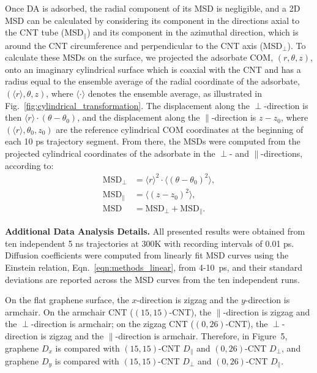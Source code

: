 \documentclass[journal=jpcbfk, layout=twocolumn, manuscript=article]{achemso}
\begin{document}
Once DA is adsorbed, the radial component of its MSD is negligible, and a 2D MSD can be calculated by considering its component in the directions axial to the CNT tube (MSD$_{\parallel}$) and its component in the azimuthal direction, which is around the CNT circumference and perpendicular to the CNT axis (MSD$_{\perp}$). To calculate these MSDs on the surface, we projected the adsorbate COM, $(r,\theta,z)$, onto an imaginary cylindrical surface which is coaxial with the CNT and has a radius equal to the ensemble average of the radial coordinate of the adsorbate, $(\langle r\rangle,\theta,z)$, where $\langle\cdot\rangle$ denotes the ensemble average, as illustrated in Fig.~\ref{fig:cylindrical_transformation}. The displacement along the $\perp$-direction is then $\langle r\rangle\cdot(\theta-\theta_0)$, and the displacement along the $\parallel$-direction is $z-z_0$, where $(\langle r\rangle, \theta_0,z_0)$ are the reference cylindrical COM coordinates at the beginning of each 10 ps trajectory segment. From there, the MSDs were computed from the projected cylindrical coordinates of the adsorbate in the $\perp$- and $\parallel$-directions, according to:
\begin{equation}
\begin{split}
\mathrm{MSD}_\perp&=\langle r\rangle^2\cdot\langle(\theta-\theta_0)^2\rangle,\\
\mathrm{MSD}_\parallel&=\langle(z-z_0)^2\rangle,\\
\mathrm{MSD}&=\mathrm{MSD}_\perp+\mathrm{MSD}_\parallel.
\end{split}
\label{eqn:MSD_CNT}
\end{equation}

{\bf{Additional Data Analysis Details.}} 
All presented results were obtained from ten independent 5 ns trajectories at 300K with recording intervals of 0.01 ps. Diffusion coefficients were computed from linearly fit MSD curves using the Einstein relation, Eqn.~\ref{eqn:methods_linear}, from 4-10~ps, and their standard deviations are reported across the MSD curves from the ten independent runs.

On the flat graphene surface, the $x$-direction is zigzag and the $y$-direction is armchair. On the armchair CNT ($(15,15)$-CNT), the $\parallel$-direction is zigzag and the $\perp$-direction is armchair; on the zigzag CNT ($(0,26)$-CNT), the $\perp$-direction is zigzag and the $\parallel$-direction is armchair. Therefore, in Figure~5, graphene $D_x$ is compared with $(15,15)$-CNT $D_\parallel$ and $(0,26)$-CNT $D_\perp$, and graphene $D_y$ is compared with $(15,15)$-CNT $D_\perp$ and $(0,26)$-CNT $D_\parallel$.
\end{document}

